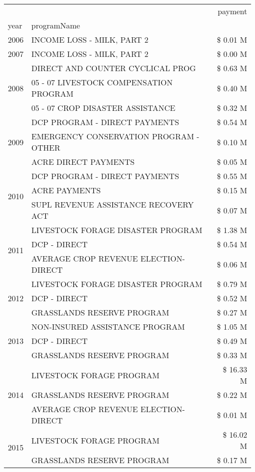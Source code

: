 \begin{tabular}{llr}
\toprule
 &  & payment \\
year & programName &  \\
\midrule
2006 & INCOME LOSS - MILK, PART 2 & \$ 0.01 M \\
\cline{1-3}
2007 & INCOME LOSS - MILK, PART 2 & \$ 0.00 M \\
\cline{1-3}
\multirow[t]{3}{*}{2008} & DIRECT AND COUNTER CYCLICAL PROG & \$ 0.63 M \\
 & 05 - 07 LIVESTOCK COMPENSATION PROGRAM & \$ 0.40 M \\
 & 05 - 07 CROP DISASTER ASSISTANCE & \$ 0.32 M \\
\cline{1-3}
\multirow[t]{3}{*}{2009} & DCP PROGRAM - DIRECT PAYMENTS & \$ 0.54 M \\
 & EMERGENCY CONSERVATION PROGRAM - OTHER & \$ 0.10 M \\
 & ACRE DIRECT PAYMENTS & \$ 0.05 M \\
\cline{1-3}
\multirow[t]{3}{*}{2010} & DCP PROGRAM - DIRECT PAYMENTS & \$ 0.55 M \\
 & ACRE PAYMENTS & \$ 0.15 M \\
 & SUPL REVENUE ASSISTANCE RECOVERY ACT & \$ 0.07 M \\
\cline{1-3}
\multirow[t]{3}{*}{2011} & LIVESTOCK FORAGE DISASTER PROGRAM & \$ 1.38 M \\
 & DCP - DIRECT & \$ 0.54 M \\
 & AVERAGE CROP REVENUE ELECTION-DIRECT & \$ 0.06 M \\
\cline{1-3}
\multirow[t]{3}{*}{2012} & LIVESTOCK FORAGE DISASTER PROGRAM & \$ 0.79 M \\
 & DCP - DIRECT & \$ 0.52 M \\
 & GRASSLANDS RESERVE PROGRAM & \$ 0.27 M \\
\cline{1-3}
\multirow[t]{3}{*}{2013} & NON-INSURED ASSISTANCE PROGRAM & \$ 1.05 M \\
 & DCP - DIRECT & \$ 0.49 M \\
 & GRASSLANDS RESERVE PROGRAM & \$ 0.33 M \\
\cline{1-3}
\multirow[t]{3}{*}{2014} & LIVESTOCK FORAGE PROGRAM & \$ 16.33 M \\
 & GRASSLANDS RESERVE PROGRAM & \$ 0.22 M \\
 & AVERAGE CROP REVENUE ELECTION-DIRECT & \$ 0.01 M \\
\cline{1-3}
\multirow[t]{3}{*}{2015} & LIVESTOCK FORAGE PROGRAM & \$ 16.02 M \\
 & GRASSLANDS RESERVE PROGRAM & \$ 0.17 M \\

\end{tabular}
